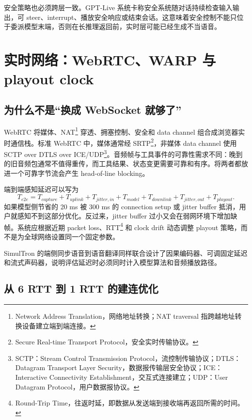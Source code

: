 \documentclass[UTF8,fontset=none,a4paper,10pt]{ctexart}
\begin{document}
安全策略也必须跨层一致。GPT-Live 系统卡称安全系统随对话持续检查输入输出，可 steer、interrupt、播放安全响应或结束会话\cite{zh:openai2026safety}。这意味着安全控制不能只位于委派模型末端，否则在长推理返回前，实时层可能已经生成不当语音。

\section{实时网络：WebRTC、WARP 与 playout clock}

\subsection{为什么不是“换成 WebSocket 就够了”}

WebRTC 将媒体、NAT\footnote{Network Address Translation，网络地址转换；NAT traversal 指跨越地址转换设备建立端到端连接。} 穿透、拥塞控制、安全和 data channel 组合成浏览器实时通信栈。标准 WebRTC 中，媒体通常经 SRTP\footnote{Secure Real-time Transport Protocol，安全实时传输协议。}，非媒体 data channel 使用 SCTP over DTLS over ICE/UDP\footnote{SCTP：Stream Control Transmission Protocol，流控制传输协议；DTLS：Datagram Transport Layer Security，数据报传输层安全协议；ICE：Interactive Connectivity Establishment，交互式连接建立；UDP：User Datagram Protocol，用户数据报协议。}\cite{zh:alvestrand2021webrtc,zh:jesup2021datachannels}。音频帧与工具事件的可靠性需求不同：晚到的旧音频包通常不值得重传，而工具结果、状态变更需要可靠和有序。将两者都放进一个可靠字节流会产生 head-of-line blocking。

端到端感知延迟可以写为
\begin{equation}
T_{e2e}=T_{capture}+T_{uplink}+T_{jitter,in}+T_{model}+T_{downlink}+T_{jitter,out}+T_{playout}.
\end{equation}
如果模型侧节省的 20 ms 被 300 ms 的 connection setup 或 jitter buffer 抵消，用户就感知不到这部分优化。反过来，jitter buffer 过小又会在弱网环境下增加缺帧。系统应根据近期 packet loss、RTT\footnote{Round-Trip Time，往返时延，即数据从发送端到接收端再返回所需的时间。} 和 clock drift 动态调整 playout 策略，而不是为全球网络设置同一个固定参数。

SimulTron 的端侧同步语音到语音翻译同样联合设计了因果编码器、可调固定延迟和流式声码器\cite{zh:agranovich2024simultron}，说明评估延迟时必须同时计入模型算法和音频播放路径。

\subsection{从 6 RTT 到 1 RTT 的建连优化}
\end{document}

